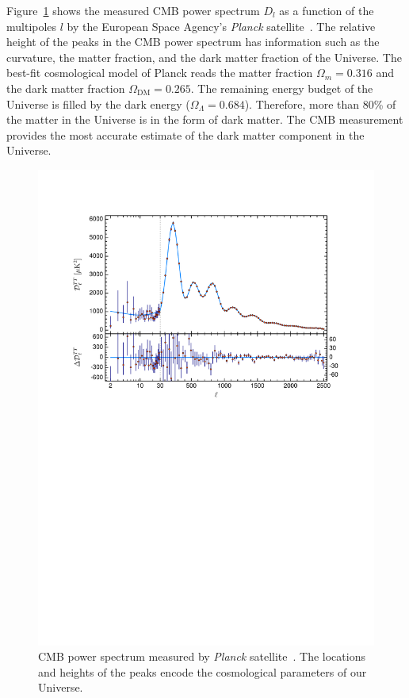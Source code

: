 \documentclass[doublespace,nopageskip]{VTthesis} %
\begin{document}
Figure~\ref{fig:cmb} shows the measured CMB power spectrum $D_l$ as a function of the multipoles $l$ by the European Space Agency's \emph{Planck} satellite~\cite{2020A&A...641A...6P}. The relative height of the peaks in the CMB power spectrum has information such as the curvature, the matter fraction, and the dark matter fraction of the Universe. The best-fit cosmological model of Planck reads the matter fraction $\Omega_m = 0.316$ and the dark matter fraction $\Omega_\mathrm{DM} = 0.265$. The remaining energy budget of the Universe is filled by the dark energy ($\Omega_\Lambda = 0.684$). Therefore, more than 80\% of the matter in the Universe is in the form of dark matter. The CMB measurement provides the most accurate estimate of the dark matter component in the Universe.
\begin{figure}[htb]
    \centering
    \includegraphics[width=\textwidth]{Figures/Intro/Planck_CMB.pdf}
    \caption{CMB power spectrum measured by \emph{Planck} satellite~\cite{2020A&A...641A...6P}. The locations and heights of the peaks encode the cosmological parameters of our Universe.}
    \label{fig:cmb}
\end{figure}
\end{document}
